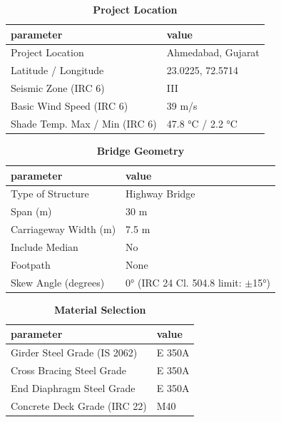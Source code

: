 \documentclass[12pt,a4paper]{report}
\numberwithin{table}{chapter}
\numberwithin{figure}{chapter}
\begin{document}
\begin{table}[H]
\caption{\textbf{Project Location}}
\label{subsec:project-location}
\begin{tabular}{|L{5.5cm}|L{8.5cm}|}
\hline
\textbf{parameter} & \textbf{value} \\
\hline
\textnormal{Project Location} & Ahmedabad, Gujarat \\
\hline
\textnormal{Latitude / Longitude} & 23.0225, 72.5714 \\
\hline
\textnormal{Seismic Zone (IRC 6)} & III \\
\hline
\textnormal{Basic Wind Speed (IRC 6)} & 39 m/s \\
\hline
\textnormal{Shade Temp. Max / Min (IRC 6)} & 47.8 °C / 2.2 °C \\
\hline
\end{tabular}
\vspace{0.4cm}
\end{table}

\begin{table}[H]
\caption{\textbf{Bridge Geometry}}
\label{subsec:bridge-geometry}
\begin{tabular}{|L{5.5cm}|L{8.5cm}|}
\hline
\textbf{parameter} & \textbf{value} \\
\hline
\textnormal{Type of Structure} & Highway Bridge \\
\hline
\textnormal{Span (m)} & 30 m \\
\hline
\textnormal{Carriageway Width (m)} & 7.5 m \\
\hline
\textnormal{Include Median} & No \\
\hline
\textnormal{Footpath} & None \\
\hline
\textnormal{Skew Angle (degrees)} & 0° (IRC 24 Cl. 504.8 limit: $\pm$15°) \\
\hline
\end{tabular}
\end{table}
\vspace{0.4cm}

\begin{table}[H]
\caption{\textbf{Material Selection}}
\label{subsec:material}
\begin{tabular}{|L{5.5cm}|L{8.5cm}|}
\hline
\textbf{parameter} & \textbf{value} \\
\hline
\textnormal{Girder Steel Grade (IS 2062)} & E 350A \\
\hline
\textnormal{Cross Bracing Steel Grade} & E 350A \\
\hline
\textnormal{End Diaphragm Steel Grade} & E 350A \\
\hline
\textnormal{Concrete Deck Grade (IRC 22)} & M40 \\
\hline
\end{tabular}
\end{table}
\vspace{0.4cm}
\end{document}
